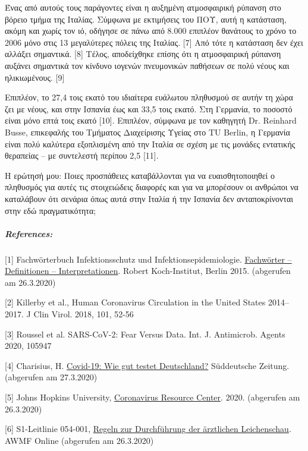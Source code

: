 Ένας από αυτούς τους παράγοντες είναι η αυξημένη ατμοσφαιρική ρύπανση
στο βόρειο τμήμα της Ιταλίας. Σύμφωνα με εκτιμήσεις του ΠΟΥ, αυτή η
κατάσταση, ακόμη και χωρίς τον ιό, οδήγησε σε πάνω από 8.000 επιπλέον
θανάτους το χρόνο το 2006 μόνο στις 13 μεγαλύτερες πόλεις της Ιταλίας.
{[}7{]} Από τότε η κατάσταση δεν έχει αλλάξει σημαντικά. {[}8{]} Τέλος,
αποδείχθηκε επίσης ότι η ατμοσφαιρική ρύπανση αυξάνει σημαντικά τον
κίνδυνο ιογενών πνευμονικών παθήσεων σε πολύ νέους και ηλικιωμένους.
{[}9{]}

Επιπλέον, το 27,4 τοις εκατό του ιδιαίτερα ευάλωτου πληθυσμού σε αυτήν
τη χώρα ζει με νέους, και στην Ισπανία έως και 33,5 τοις εκατό. Στη
Γερμανία, το ποσοστό είναι μόνο επτά τοις εκατό {[}10{]}. Επιπλέον,
σύμφωνα με τον καθηγητή Dr. Reinhard Busse, επικεφαλής του Τμήματος
Διαχείρισης Υγείας στο TU Berlin, η Γερμανία είναι πολύ καλύτερα
εξοπλισμένη από την Ιταλία σε σχέση με τις μονάδες εντατικής θεραπείας
-- με συντελεστή περίπου 2,5 {[}11{]}.

Η ερώτησή μου: Ποιες προσπάθειες καταβάλλονται για να ευαισθητοποιηθεί ο
πληθυσμός για αυτές τις στοιχειώδεις διαφορές και για να μπορέσουν οι
ανθρώποι να καταλάβουν ότι σενάρια όπως αυτά στην Ιταλία ή την Ισπανία
δεν ανταποκρίνονται στην εδώ πραγματικότητα;

\hypertarget{references}{%
\subparagraph{\texorpdfstring{\textbf{References:}}{References:}}\label{references}}

{[}1{]} Fachwörterbuch Infektionsschutz und Infektionsepidemiologie.
\href{https://www.rki.de/DE/Content/Service/Publikationen/Fachwoerterbuch_Infektionsschutz.html}{Fachwörter
-- Definitionen -- Interpretationen}. Robert Koch-Institut, Berlin 2015.
(abgerufen am 26.3.2020)

{[}2{]} Killerby et al., Human Coronavirus Circulation in the United
States 2014--2017. J Clin Virol. 2018, 101, 52-56

{[}3{]} Roussel et al. SARS-CoV-2: Fear Versus Data. Int. J. Antimicrob.
Agents 2020, 105947

{[}4{]} Charisius, H.
\href{https://www.sueddeutsche.de/gesundheit/covid-19-coronavirus-testverfahren-1.4855487}{Covid-19:
Wie gut testet Deutschland?} Süddeutsche Zeitung. (abgerufen am
27.3.2020)

{[}5{]} Johns Hopkins University,
\href{https://coronavirus.jhu.edu/map.html}{Coronavirus Resource
Center}. 2020. (abgerufen am 26.3.2020)

{[}6{]} S1-Leitlinie 054-001,
\href{https://www.awmf.org/uploads/tx_szleitlinien/054-002l_S1_Regeln-zur-Durchfuehrung-der-aerztlichen-Leichenschau_2018-02_01.pdf}{Regeln
zur Durchführung der ärztlichen Leichenschau}. AWMF Online (abgerufen am
26.3.2020)

